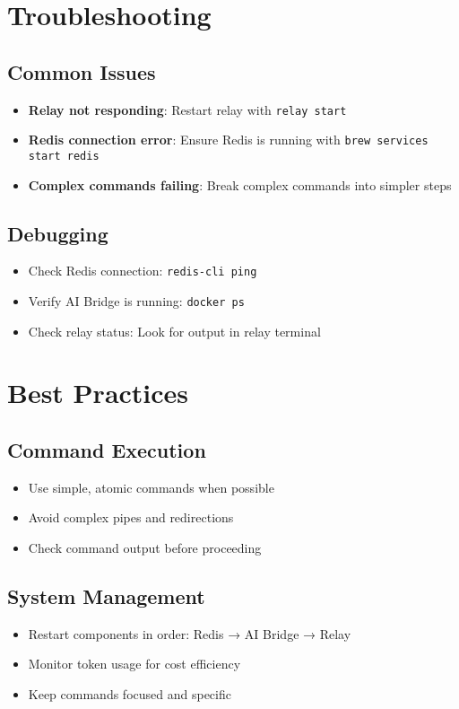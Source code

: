 \documentclass{article}
\begin{document}
\section{Troubleshooting}

\subsection{Common Issues}
\begin{itemize}
    \item \textbf{Relay not responding}: Restart relay with \texttt{relay start}
    \item \textbf{Redis connection error}: Ensure Redis is running with \texttt{brew services start redis}
    \item \textbf{Complex commands failing}: Break complex commands into simpler steps
\end{itemize}

\subsection{Debugging}
\begin{itemize}
    \item Check Redis connection: \texttt{redis-cli ping}
    \item Verify AI Bridge is running: \texttt{docker ps}
    \item Check relay status: Look for output in relay terminal
\end{itemize}

\section{Best Practices}

\subsection{Command Execution}
\begin{itemize}
    \item Use simple, atomic commands when possible
    \item Avoid complex pipes and redirections
    \item Check command output before proceeding
\end{itemize}

\subsection{System Management}
\begin{itemize}
    \item Restart components in order: Redis → AI Bridge → Relay
    \item Monitor token usage for cost efficiency
    \item Keep commands focused and specific
\end{itemize}
\end{document}
